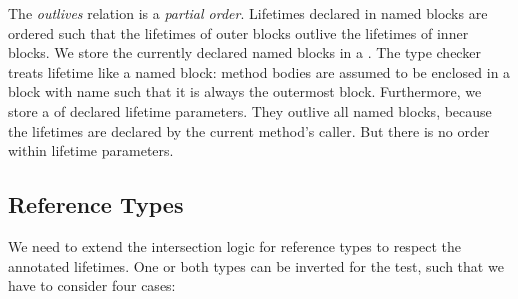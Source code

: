 The \emph{outlives} relation is a \emph{partial order}.
Lifetimes declared in named blocks are ordered such that the lifetimes of outer blocks outlive the lifetimes of inner blocks.
We store the currently declared named blocks in a .
The type checker treats lifetime  like a named block:
method bodies are assumed to be enclosed in a block with name  such that it is always the outermost block.
Furthermore, we store a  of declared lifetime parameters.
They outlive all named blocks, because the lifetimes are declared by the current method's caller.
But there is no order within lifetime parameters.


\subsection{Reference Types}

We need to extend the intersection logic for reference types to respect the annotated lifetimes.
One or both types can be inverted for the test, such that we have to consider four cases:

